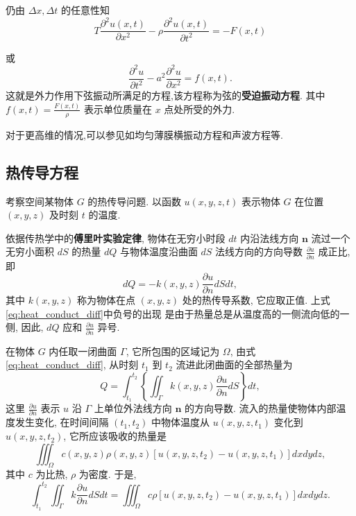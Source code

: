 仍由 $\Delta x, \Delta t$ 的任意性知
$$
T \frac{\partial^2 u(x, t)}{\partial x^2}-\rho \frac{\partial^2 u(x, t)}{\partial t^2}=-F(x, t)
$$

或
\begin{equation}
\frac{\partial^2 u}{\partial t^2}-a^2 \frac{\partial^2 u}{\partial x^2}=f(x, t) .
\label{eq:forced_vibration}
\end{equation}
这就是外力作用下弦振动所满足的方程,该方程称为弦的\textbf{受迫振动方程}.
其中 $f(x, t)=\frac{F(x, t)}{\rho}$ 表示单位质量在 $x$ 点处所受的外力.


对于更高维的情况,可以参见如均匀薄膜横振动方程和声波方程等.

\subsection{热传导方程}
考察空间某物体 $G$ 的热传导问题. 以函数 $u(x, y, z, t)$ 表示物体 $G$ 在位置 $(x, y, z)$ 
及时刻 $t$ 的温度.

依据传热学中的\textbf{傅里叶实验定律}, 物体在无穷小时段 $d t$ 内沿法线方向 $\boldsymbol{n}$ 流过一个无穷小面积 $d S$ 的热量 $d Q$ 
与物体温度沿曲面 $d S$ 法线方向的方向导数 $\frac{\partial u}{\partial n}$ 成正比, 即
\begin{equation}
d Q=-k(x, y, z) \frac{\partial u}{\partial n} d S d t,
\label{eq:heat_conduct_diff}
\end{equation}
其中 $k(x, y, z)$ 称为物体在点 $(x, y, z)$ 处的热传导系数, 它应取正值. 上式\ref{eq:heat_conduct_diff}中负号的出现
是由于热量总是从温度高的一侧流向低的一侧, 因此, $d Q$ 应和 $\frac{\partial u}{\partial n}$ 异号.

在物体 $G$ 内任取一闭曲面 $\Gamma$, 它所包围的区域记为 $\Omega$, 由式\ref{eq:heat_conduct_diff}, 
从时刻 $t_1$ 到 $t_2$ 流进此闭曲面的全部热量为
$$
Q=\int_{t_1}^{t_2}\left\{\iint_{\Gamma} k(x, y, z) \frac{\partial u}{\partial n} d S\right\} d t,
$$
这里 $\frac{\partial u}{\partial n}$ 表示 $u$ 沿 $\Gamma$ 上单位外法线方向 $\boldsymbol{n}$ 的方向导数.
流入的热量使物体内部温度发生变化, 在时间间隔 $\left(t_1, t_2\right)$ 中物体温度从 $u(x, y, z,  t_1 )$ 变化到 $u\left(x, y, z, t_2\right)$, 它所应该吸收的热量是
$$
\iiint_{\Omega} c(x, y, z) \rho(x, y, z)\left[u\left(x, y, z, t_2\right)-u\left(x, y, z, t_1\right)\right] d x d y d z,
$$
其中 $c$ 为比热, $\rho$ 为密度. 于是,
$$
    \int_{t_1}^{t_2} \iint_{\Gamma} k \frac{\partial u}{\partial n} d S d t=
    \iiint_{\Omega} c \rho\left[u\left(x, y, z, t_2\right)-u\left(x, y, z, t_1\right)\right] d x d y d z . 
$$

